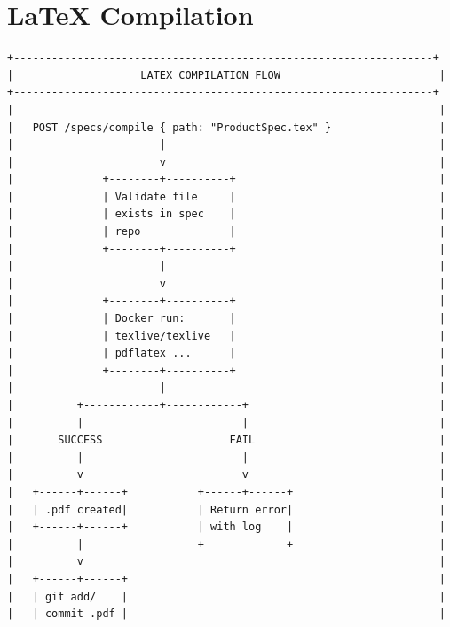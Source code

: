 \documentclass[11pt,a4paper]{article}
\begin{document}
\section{LaTeX Compilation}

\begin{verbatim}
+------------------------------------------------------------------+
|                    LATEX COMPILATION FLOW                         |
+------------------------------------------------------------------+
|                                                                   |
|   POST /specs/compile { path: "ProductSpec.tex" }                 |
|                       |                                           |
|                       v                                           |
|              +--------+----------+                                |
|              | Validate file     |                                |
|              | exists in spec    |                                |
|              | repo              |                                |
|              +--------+----------+                                |
|                       |                                           |
|                       v                                           |
|              +--------+----------+                                |
|              | Docker run:       |                                |
|              | texlive/texlive   |                                |
|              | pdflatex ...      |                                |
|              +--------+----------+                                |
|                       |                                           |
|          +------------+------------+                              |
|          |                         |                              |
|       SUCCESS                    FAIL                             |
|          |                         |                              |
|          v                         v                              |
|   +------+------+           +------+------+                       |
|   | .pdf created|           | Return error|                       |
|   +------+------+           | with log    |                       |
|          |                  +-------------+                       |
|          v                                                        |
|   +------+------+                                                 |
|   | git add/    |                                                 |
|   | commit .pdf |                                                 |

\end{verbatim}
\end{document}
